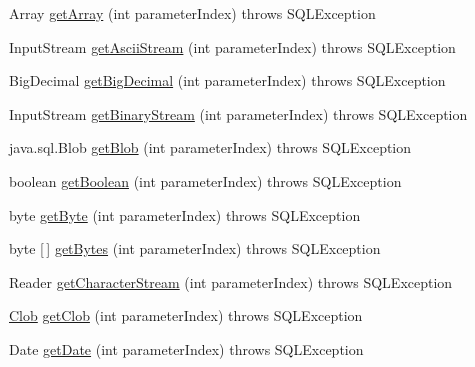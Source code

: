 \begin{DoxyCompactItemize}
\item 
Array \mbox{\hyperlink{interfacecom_1_1mysql_1_1cj_1_1jdbc_1_1_parameter_bindings_aef9b2cf9ed976523c1ffcb9356f7b572}{get\+Array}} (int parameter\+Index)  throws S\+Q\+L\+Exception
\item 
Input\+Stream \mbox{\hyperlink{interfacecom_1_1mysql_1_1cj_1_1jdbc_1_1_parameter_bindings_aef04186958c6a6067af23f85e11ded42}{get\+Ascii\+Stream}} (int parameter\+Index)  throws S\+Q\+L\+Exception
\item 
Big\+Decimal \mbox{\hyperlink{interfacecom_1_1mysql_1_1cj_1_1jdbc_1_1_parameter_bindings_a3be632244faa0f3ef879487dab735c0a}{get\+Big\+Decimal}} (int parameter\+Index)  throws S\+Q\+L\+Exception
\item 
Input\+Stream \mbox{\hyperlink{interfacecom_1_1mysql_1_1cj_1_1jdbc_1_1_parameter_bindings_a44a197f30824a608aa60452511182f2e}{get\+Binary\+Stream}} (int parameter\+Index)  throws S\+Q\+L\+Exception
\item 
java.\+sql.\+Blob \mbox{\hyperlink{interfacecom_1_1mysql_1_1cj_1_1jdbc_1_1_parameter_bindings_a9455feead5f24c34810e321e72a7db5b}{get\+Blob}} (int parameter\+Index)  throws S\+Q\+L\+Exception
\item 
boolean \mbox{\hyperlink{interfacecom_1_1mysql_1_1cj_1_1jdbc_1_1_parameter_bindings_aace0f45323430fcbe352d9388313c0d6}{get\+Boolean}} (int parameter\+Index)  throws S\+Q\+L\+Exception
\item 
byte \mbox{\hyperlink{interfacecom_1_1mysql_1_1cj_1_1jdbc_1_1_parameter_bindings_a8f731a8fd06424ba003d9e515242eba9}{get\+Byte}} (int parameter\+Index)  throws S\+Q\+L\+Exception
\item 
byte \mbox{[}$\,$\mbox{]} \mbox{\hyperlink{interfacecom_1_1mysql_1_1cj_1_1jdbc_1_1_parameter_bindings_a6078f75ef60b84450f5463b5c71886e0}{get\+Bytes}} (int parameter\+Index)  throws S\+Q\+L\+Exception
\item 
Reader \mbox{\hyperlink{interfacecom_1_1mysql_1_1cj_1_1jdbc_1_1_parameter_bindings_a0d60a9da60310e6edba977bcb821936b}{get\+Character\+Stream}} (int parameter\+Index)  throws S\+Q\+L\+Exception
\item 
\mbox{\hyperlink{classcom_1_1mysql_1_1cj_1_1jdbc_1_1_clob}{Clob}} \mbox{\hyperlink{interfacecom_1_1mysql_1_1cj_1_1jdbc_1_1_parameter_bindings_ab571246dfa58b9015a37d38ae9f9d963}{get\+Clob}} (int parameter\+Index)  throws S\+Q\+L\+Exception
\item 
Date \mbox{\hyperlink{interfacecom_1_1mysql_1_1cj_1_1jdbc_1_1_parameter_bindings_acd82f7279a45dfadbd44bda480635097}{get\+Date}} (int parameter\+Index)  throws S\+Q\+L\+Exception

\end{DoxyCompactItemize}
